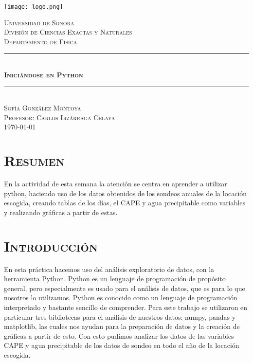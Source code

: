\documentclass[12pt]{article}
\begin{document}

\begin{titlepage}
\newcommand{\Hrule}{\rule{\linewidth}{0.5mm}}

\begin{center}
\texttt{[image: logo.png]}
\end{center}

\begin{center}
\textsc{\LARGE Universidad de Sonora}\\[0.5cm]
\textsc{División de Ciencias Exactas y Naturales}\\[0.1cm]
\textsc{Departamento de Física}\\[1.5cm]
\Hrule \\[0.5cm]   
   \textsc{\LARGE \bfseries Iniciándose en Python} \\[0.5cm]
\Hrule \\[1.5cm]
\textsc{\Large Sofía González Montoya} \\[1cm]
\textsc{\Large Profesor: Carlos Lizárraga Celaya} \\[2.5cm]
\textsc{\today}
\end{center}
\end{titlepage}
\pagebreak

\doublespacing
\section{\textsc{Resumen}}
En la actividad de esta semana la atención se centra en aprender a utilizar python, haciendo uso de los datos obtenidos de los sondeos anuales de la locación escogida, creando tablas de los días, el CAPE y agua precipitable como variables y realizando gráficas a partir de estas.

\section{\textsc{Introducción}}
En esta práctica hacemos uso del análisis exploratorio de datos, con la herramienta Python. Python es un lenguaje de programación de propósito general, pero especialmente es usado para el análisis de datos, que es para lo que nosotros lo utilizamos. Python es conocido como un lenguaje de programación interpretado y bastante sencillo de comprender. Para este trabajo se utilizaron en particular tres bibliotecas para el análisis de nuestros datos: numpy, pandas y matplotlib, las cuales nos ayudan para la preparación de datos y la creación de gráficas a partir de esto. Con esto pudimos analizar los datos de las variables CAPE y agua precipitable de los datos de sondeo en todo el año de la locación escogida. 
\end{document}
